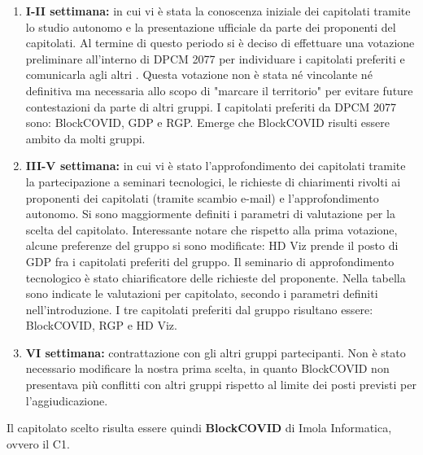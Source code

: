 \begin{enumerate}
\item \textbf{I-II settimana:} in cui vi è stata la conoscenza iniziale dei capitolati tramite lo studio autonomo e la presentazione ufficiale da parte dei proponenti del capitolati. Al termine di questo periodo si è deciso di effettuare una votazione preliminare all'interno di DPCM 2077 per individuare i capitolati preferiti e comunicarla agli altri . Questa votazione non è stata né vincolante né definitiva ma necessaria allo scopo di "marcare il territorio" per evitare future contestazioni da parte di altri gruppi. I capitolati preferiti da DPCM 2077 sono: BlockCOVID, GDP e RGP. Emerge che BlockCOVID risulti essere ambito da molti gruppi.  
\item \textbf{III-V settimana:} in cui vi è stato l'approfondimento dei capitolati tramite la partecipazione a seminari tecnologici, le richieste di chiarimenti rivolti ai proponenti dei capitolati (tramite scambio e-mail) e l'approfondimento autonomo. Si sono maggiormente definiti i parametri di valutazione per la scelta del capitolato. Interessante notare che rispetto alla prima votazione, alcune preferenze del gruppo si sono modificate: HD Viz prende il posto di GDP fra i capitolati preferiti del gruppo. Il seminario di approfondimento tecnologico è stato chiarificatore delle richieste del proponente. Nella tabella sono indicate le valutazioni per capitolato, secondo i parametri definiti nell'introduzione. I tre capitolati preferiti dal gruppo risultano essere: BlockCOVID, RGP e HD Viz.
\item \textbf{VI settimana:} contrattazione con gli altri gruppi partecipanti. Non è stato necessario modificare la nostra prima scelta, in quanto BlockCOVID non presentava più conflitti con altri gruppi rispetto al limite dei posti previsti per l'aggiudicazione.
\end{enumerate}

Il capitolato scelto risulta essere quindi \textbf{BlockCOVID} di Imola Informatica, ovvero il C1.